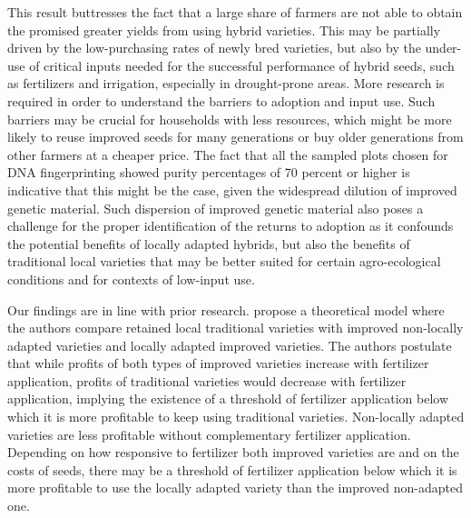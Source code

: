 \documentclass[11pt]{article}
\begin{document}
This result buttresses the fact that a large share of farmers are not able to obtain the promised greater yields from using hybrid varieties. This may be partially driven by the low-purchasing rates of newly bred varieties, but also by the under-use of critical inputs needed for the successful performance of hybrid seeds, such as fertilizers and irrigation, especially in drought-prone areas. More research is required in order to understand the barriers to adoption and input use. Such barriers may be crucial for households with less resources, which might be more likely to reuse improved seeds for many generations or buy older generations from other farmers at a cheaper price. The fact that all the sampled plots chosen for DNA fingerprinting showed purity percentages of 70 percent or higher is indicative that this might be the case, given the widespread dilution of improved genetic material. Such dispersion of improved genetic material also poses a challenge for the proper identification of the returns to adoption as it confounds the potential benefits of locally adapted hybrids, but also the benefits of traditional local varieties that may be better suited for certain agro-ecological conditions and for contexts of low-input use.  

Our findings are in line with prior research. \cite{Bird2020-nt} propose a theoretical model where the authors compare retained local traditional varieties with improved non-locally adapted varieties and locally adapted improved varieties. The authors postulate that while profits of both types of improved varieties increase with fertilizer application, profits of traditional varieties would decrease with fertilizer application, implying the existence of a threshold of fertilizer application below which it is more profitable to keep using traditional varieties. Non-locally adapted varieties are less profitable without complementary fertilizer application. Depending on how responsive to fertilizer both improved varieties are and on the costs of seeds, there may be a threshold of fertilizer application below which it is more profitable to use the locally adapted variety than the improved non-adapted one. \par
\end{document}
